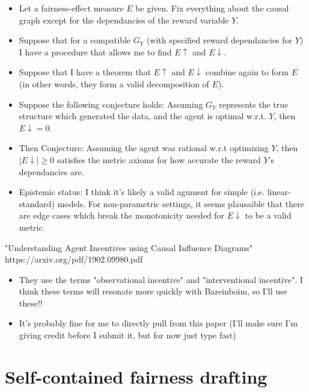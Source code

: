 \documentclass[letterpaper,10pt]{article}
\begin{document}
\begin{itemize}
\begin{itemize}
    \item Let a fairness-effect measure $E$ be given. Fix everything about the causal graph except for the dependancies of the reward variable $Y$.
    \item Suppose that for a compatible $G_Y$ (with specified reward dependancies for $Y$) I have a procedure that allows me to find $E\uparrow$ and $E\downarrow$. 
    \item Suppose that I have a theorem that $E\uparrow$ and $E\downarrow$ combine again to form $E$ (in other words, they form a valid decomposition of $E$).
    \item Suppose the following conjecture holds: Assuming $G_Y$ represents the true structure which generated the data, and the agent is optimal w.r.t. $Y$, then $E\downarrow=0$.
    \item Then Conjecture: Assuming the agent was rational w.r.t optimizing $Y$, then $|E\downarrow|\ge0$ satisfies the metric axioms for how accurate the reward $Y$'s dependancies are.
    \item Epistemic status: I think it's likely a valid agument for simple (i.e. linear-standard) models. For non-parametric settings, it seems plausaible that there are edge cases which break the monotonicity needed for $E\downarrow$ to be a valid metric.
  \end{itemize}
\end{itemize}

"Understanding Agent Incentives using Causal Influence Diagrams" https://arxiv.org/pdf/1902.09980.pdf
\begin{itemize}
  \item They use the terms "observational incentive" and "interventional incentive". I think these terms will resonate more quickly with Bareinboim, so I'll use these!!
  \item It's probably fine for me to directly pull from this paper (I'll make sure I'm giving credit before I submit it, but for now just type fast)  
\end{itemize}


\section{Self-contained fairness drafting}
\end{document}
